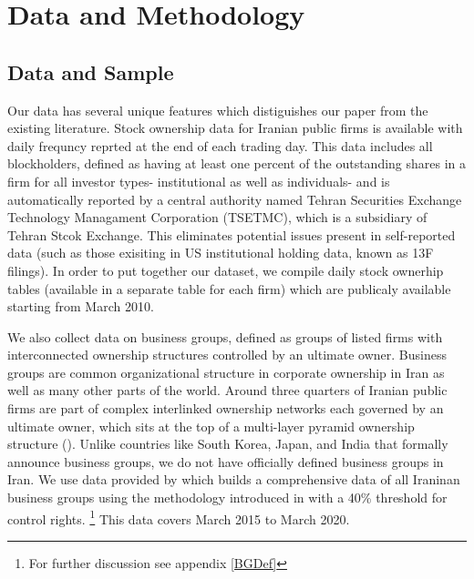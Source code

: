 
\section{{Data and Methodology}}



\subsection{{Data and Sample}}



Our data has several unique features which distiguishes our paper from the existing literature. Stock ownership data for Iranian public firms is available with daily frequncy reprted at the end of each trading day. This data includes all blockholders, defined as having at least one percent of the outstanding shares in a firm for all investor types- institutional as well as individuals- and is automatically reported by a central authority named Tehran Securities Exchange Technology Managament Corporation (TSETMC), which is a subsidiary of Tehran Stcok Exchange. This eliminates potential issues present in self-reported data (such as those exisiting in US institutional holding data, known as 13F filings). In order to put together our dataset, we compile daily stock ownerhip tables (available in a separate table for each firm) which are publicaly available starting from March 2010.


We also collect data on business groups, defined as groups of listed firms with interconnected ownership structures controlled by an ultimate owner. Business groups are common organizational structure in corporate ownership in Iran as well as many other parts of the world. Around three quarters of Iranian public firms are part of complex interlinked ownership networks each governed by an ultimate owner, which sits at the top of a multi-layer pyramid ownership structure ({\cite{Aliabadi2022}}). Unlike countries like South Korea, Japan, and India that formally announce business groups, we do not have officially defined business groups in Iran. We use data provided by {\cite{Aliabadi2022}} which builds a comprehensive data of all Iraninan business groups using the methodology introduced in \cite{almeida2011structure} with a 40\% threshold for control rights. \footnote{For further discussion see appendix \ref{BGDef}} This data covers March 2015 to March 2020. 




